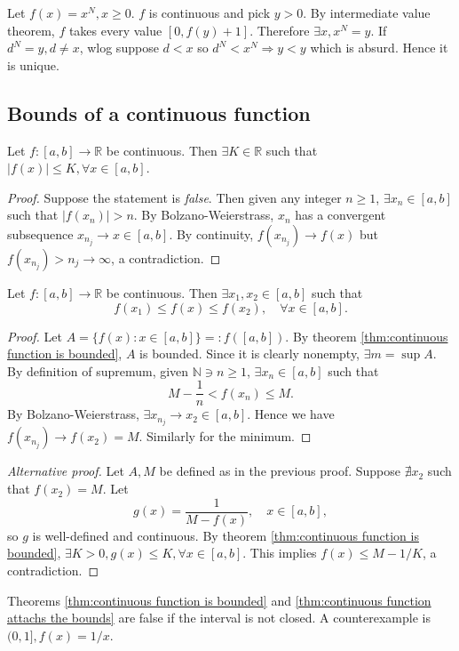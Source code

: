 \begin{example}
    Let $ f(x)=x^N, x\ge 0 $. $f$ is continuous and pick $y>0$. By intermediate value theorem, $f$ takes every value $ [0,f(y)+1] $. Therefore $ \exists x, x^N=y $. If $ d^N=y,d\neq x $, wlog suppose $d<x$ so $ d^N<x^N \Rightarrow y<y $ which is absurd. Hence it is unique. 
\end{example}

\subsection{Bounds of a continuous function}
\begin{theorem}\label{thm:continuous function is bounded}
    Let $f:[a,b]\to \mathbb{R}$ be continuous. Then $ \exists K\in \mathbb{R}  $ such that $ |f(x)|\le K, \forall x\in [a,b] $.
\end{theorem}
\begin{proof}
    Suppose the statement is \textit{false}. Then given any integer $ n\ge 1 $, $ \exists x_n\in[a,b] $ such that $ |f(x_n)|> n $. By Bolzano-Weierstrass, $x_n$ has a convergent subsequence $ x_{n_j}\to x\in [a,b] $. By continuity, $ f(x_{n_j})\to f(x) $ but $f(x_{n_j})>n_j\to \infty$, a contradiction.
\end{proof}

\begin{theorem}\label{thm:continuous function attachs the bounds}
    Let $ f:[a,b]\to \mathbb{R} $ be continuous. Then $ \exists x_1,x_2\in [a,b] $ such that 
    \[
        f(x_1)\le f(x)\le f(x_2),\quad \forall x\in [a,b].
    \]
\end{theorem}
\begin{proof}
    Let $ A = \{f(x):x\in [a,b]\}=: f([a,b]) $. By theorem \ref{thm:continuous function is bounded}, $A$ is bounded. Since it is clearly nonempty, $ \exists m = \sup A $. By definition of supremum, given $ \mathbb{N} \ni n\ge 1$, $ \exists x_n\in [a,b] $ such that 
    \[
        M-\frac{1}{n}<f(x_n)\le M.
    \]
    By Bolzano-Weierstrass, $ \exists x_{n_j}\to x_2\in [a,b] $. Hence we have $ f(x_{n_j})\to f(x_2) = M $. Similarly for the minimum.
\end{proof}

\begin{proof}[Alternative proof]
    Let $A,M$ be defined as in the previous proof. Suppose $\nexists x_2$ such that $ f(x_2)=M $. Let 
    \[
        g(x) = \frac{1}{M-f(x)},\quad x\in [a,b],
    \]
    so $g$ is well-defined and continuous. By theorem \ref{thm:continuous function is bounded}, $ \exists K>0, g(x)\le K,\forall x\in [a,b] $. This implies $ f(x)\le M-1/K $, a contradiction.
\end{proof}
\begin{note}
    Theorems \ref{thm:continuous function is bounded} and \ref{thm:continuous function attachs the bounds} are false if the interval is not closed. A counterexample is $ (0,1], f(x)=1/x $.
\end{note}

